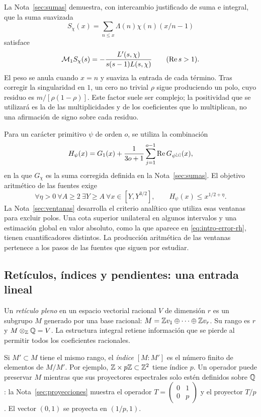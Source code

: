 La Nota~\ref{sec:sumas} demuestra, con intercambio justificado de suma
e integral, que la suma suavizada
\[
 S_\chi(x)=\sum_{n\le x}\Lambda(n)\chi(n)(x/n-1)
\]
satisface
\[
 \mathcal M_1 S_\chi(s)=-\frac{L'(s,\chi)}{s(s-1)L(s,\chi)}
 \qquad(\operatorname{Re} s>1).
\]
El peso se anula cuando $x=n$ y suaviza la entrada de cada término.
Tras corregir la singularidad en $1$, un cero no trivial $\rho$ sigue
produciendo un polo, cuyo residuo es
$m/[\rho(1-\rho)]$. Este factor suele ser complejo; la positividad
que se utilizará es la de las multiplicidades y de los coeficientes
que lo multiplican, no una afirmación de signo sobre cada residuo.

Para un carácter primitivo $\psi$ de orden $o$, se utiliza la combinación
\[
 H_\psi(x)=G_1(x)+\frac1{3o+1}
     \sum_{j=1}^{o-1}\operatorname{Re} G_{\psi^{[j]}}(x),
\]
en la que $G_\chi$ es la suma corregida definida en la Nota~\ref{sec:sumas}.
El objetivo aritmético de las fuentes exige
\begin{equation}
 \forall\eta>0\ \forall A\ge2\ \exists Y\ge A\ \forall x\in[Y,Y^{3/2}],
 \qquad H_\psi(x)\le x^{1/2+\eta}.
 \label{eq:intro-ventanas}
\end{equation}
La Nota~\ref{sec:ventanas} desarrolla el criterio analítico que utiliza
esas ventanas para excluir polos. Una cota superior unilateral en algunos
intervalos y una estimación global en valor absoluto, como la que aparece
en \eqref{eq:intro-error-rh}, tienen cuantificadores distintos.
La producción aritmética de las ventanas pertenece a los pasos de las
fuentes que siguen por estudiar.

\subsection{Retículos, índices y pendientes: una entrada lineal}

Un \emph{retículo pleno} en un espacio vectorial racional $V$ de dimensión
$r$ es un subgrupo $M$ generado por una base racional:
$M=\mathbb{Z} v_1\oplus\cdots\oplus\mathbb{Z} v_r$. Su rango es $r$ y
$M\otimes_{\mathbb{Z}}\mathbb{Q}=V$. La estructura integral retiene información que se
pierde al permitir todos los coeficientes racionales.

Si $M'\subset M$ tiene el mismo rango, el \emph{índice}
$[M:M']$ es el número finito de elementos de $M/M'$. Por ejemplo,
$\mathbb{Z}\times p\mathbb{Z}\subset\mathbb{Z}^2$ tiene índice $p$. Un operador puede preservar
$M$ mientras que sus proyectores espectrales solo estén definidos sobre
$\mathbb{Q}$: la Nota~\ref{sec:proyecciones} muestra el operador
$T=\left(\begin{smallmatrix}0&1\\0&p\end{smallmatrix}\right)$ y el
proyector $T/p$. El vector $(0,1)$ se proyecta en $(1/p,1)$.


